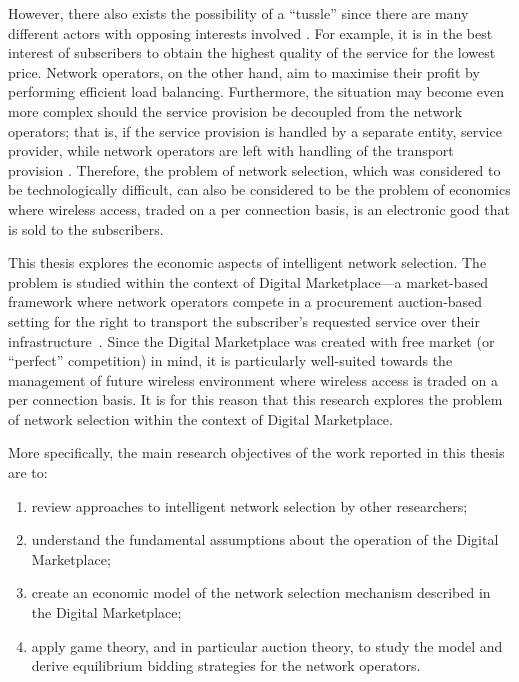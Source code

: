 However, there also exists the possibility of a ``tussle'' since there are many different actors with opposing interests involved \cite{Clark02}. For example, it is in the best interest of subscribers to obtain the highest quality of the service for the lowest price. Network operators, on the other hand, aim to maximise their profit by performing efficient load balancing. Furthermore, the situation may become even more complex should the service provision be decoupled from the network operators; that is, if the service provision is handled by a separate entity, service provider, while network operators are left with handling of the transport provision \cite{DMBushTussle09}. Therefore, the problem of network selection, which was considered to be technologically difficult, can also be considered to be the problem of economics where wireless access, traded on a per connection basis, is an electronic good that is sold to the subscribers.

This thesis explores the economic aspects of intelligent network selection. The problem is studied within the context of Digital Marketplace---a  market-based framework where network operators compete in a procurement auction-based setting for the right to transport the subscriber's requested service over their infrastructure~\cite{DMLeBodic00}. Since the Digital Marketplace was created with free market (or ``perfect'' competition) in mind, it is particularly well-suited towards the management of future wireless environment where wireless access is traded on a per connection basis. It is for this reason that this research explores the problem of network selection within the context of Digital Marketplace.

More specifically, the main research objectives of the work reported in this thesis are to:
\begin{enumerate}
\item review approaches to intelligent network selection by other researchers;
\item understand the fundamental assumptions about the operation of the Digital Marketplace;
\item create an economic model of the network selection mechanism described in the Digital Marketplace;
\item apply game theory, and in particular auction theory, to study the model and derive equilibrium bidding strategies for the network operators.
\end{enumerate}

